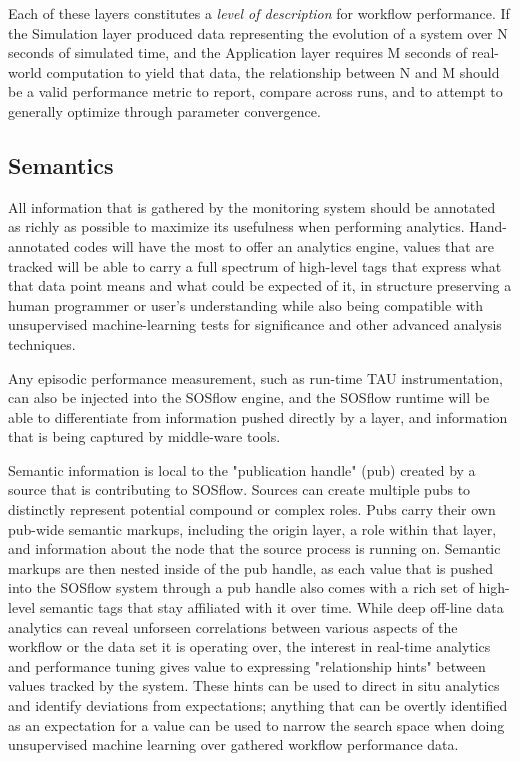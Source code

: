 Each of these layers constitutes a \textit{level of description} for
workflow performance. If the Simulation layer produced data
representing the evolution of a system over N seconds of simulated
time, and the Application layer requires M seconds of real-world
computation to yield that data, the relationship between N and M
should be a valid performance metric to report, compare across runs,
and to attempt to generally optimize through parameter convergence.

\subsection{Semantics}
All information that is gathered by the monitoring system should be
annotated as richly as possible to maximize its usefulness when
performing analytics.  Hand-annotated codes will have the most to
offer an analytics engine, values that are tracked will be able to
carry a full spectrum of high-level tags that express what that data
point means and what could be expected of it, in structure preserving
a human programmer or user's understanding while also being compatible
with unsupervised machine-learning tests for significance and other
advanced analysis techniques.

Any episodic performance measurement, such as run-time TAU
instrumentation, can also be injected into the SOSflow engine, and the
SOSflow runtime will be able to differentiate from information pushed
directly by a layer, and information that is being captured by
middle-ware tools.


Semantic information is local to the "publication handle" (pub)
created by a source that is contributing to SOSflow.  Sources can
create multiple pubs to distinctly represent potential compound or
complex roles. Pubs carry their own pub-wide semantic markups,
including the origin layer, a role within that layer, and information
about the node that the source process is running on. Semantic markups
are then nested inside of the pub handle, as each value that is pushed
into the SOSflow system through a pub handle also comes with a rich
set of high-level semantic tags that stay affiliated with it over
time. While deep off-line data analytics can reveal unforseen
correlations between various aspects of the workflow or the data set
it is operating over, the interest in real-time analytics and
performance tuning gives value to expressing "relationship hints"
between values tracked by the system. These hints can be used to
direct in situ analytics and identify deviations from expectations;
anything that can be overtly identified as an expectation for a value
can be used to narrow the search space when doing unsupervised machine
learning over gathered workflow performance data.

